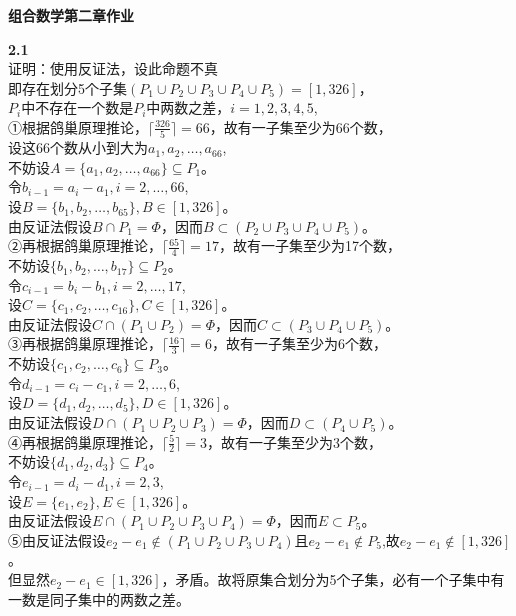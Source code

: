 \documentclass[a4paper,12pt]{article}
\begin{document}
	
	\begin{center}
		{\large \textbf{组合数学第二章作业}}
	\end{center}
	
	\noindent
	\textbf{2.1}\\
	证明：使用反证法，设此命题不真\\
	即存在划分5个子集$(P_{1}\cup P_{2}\cup P_{3}\cup P_{4}\cup P_{5})=[1,326]$，\\
	$P_{i}$中不存在一个数是$P_{i}$中两数之差，$i=1,2,3,4,5$,\\
	①根据鸽巢原理推论，$\lceil\frac{326}{5}\rceil=66$，故有一子集至少为66个数，\\
	设这66个数从小到大为$a_{1},a_{2},\dots,a_{66}$,\\
	不妨设$A=\{a_{1},a_{2},\dots,a_{66}\}\subseteq P_{1}$。\\
	令$b_{i-1}=a_{i}-a_{1},i=2,\dots,66$,\\
	设$B=\{b_{1},b_{2},\dots,b_{65}\},B\in [1,326]$。\\
	由反证法假设$B\cap P_{1}=\Phi$，因而$B\subset (P_{2}\cup P_{3}\cup P_{4}\cup P_{5})$。\\
	②再根据鸽巢原理推论，$\lceil\frac{65}{4}\rceil=17$，故有一子集至少为17个数，\\
	不妨设$\{b_{1},b_{2},\dots,b_{17}\}\subseteq P_{2}$。\\
	令$c_{i-1}=b_{i}-b_{1},i=2,\dots,17$,\\
	设$C=\{c_{1},c_{2},\dots,c_{16}\},C\in [1,326]$。\\
	由反证法假设$C\cap (P_{1}\cup P_{2})=\Phi$，因而$C\subset (P_{3}\cup P_{4}\cup P_{5})$。\\
	③再根据鸽巢原理推论，$\lceil\frac{16}{3}\rceil=6$，故有一子集至少为6个数，\\
	不妨设$\{c_{1},c_{2},\dots,c_{6}\}\subseteq P_{3}$。\\
	令$d_{i-1}=c_{i}-c_{1},i=2,\dots,6$,\\
	设$D=\{d_{1},d_{2},\dots,d_{5}\},D\in [1,326]$。\\
	由反证法假设$D\cap (P_{1}\cup P_{2}\cup P_{3})=\Phi$，因而$D\subset (P_{4}\cup P_{5})$。\\
	④再根据鸽巢原理推论，$\lceil\frac{5}{2}\rceil=3$，故有一子集至少为3个数，\\
	不妨设$\{d_{1},d_{2},d_{3}\}\subseteq P_{4}$。\\
	令$e_{i-1}=d_{i}-d_{1},i=2,3$,\\
	设$E=\{e_{1},e_{2}\},E\in [1,326]$。\\
	由反证法假设$E\cap (P_{1}\cup P_{2}\cup P_{3}\cup P_{4})=\Phi$，因而$E\subset P_{5}$。\\
	⑤由反证法假设$e_{2}-e_{1}\notin(P_{1}\cup P_{2}\cup P_{3}\cup P_{4})$且$e_{2}-e_{1}\notin P_{5}$,故$e_{2}-e_{1}\notin [1,326]$。\\
	但显然$e_{2}-e_{1}\in [1,326]$，矛盾。故将原集合划分为5个子集，必有一个子集中有一数是同子集中的两数之差。\\
	
\end{document}
